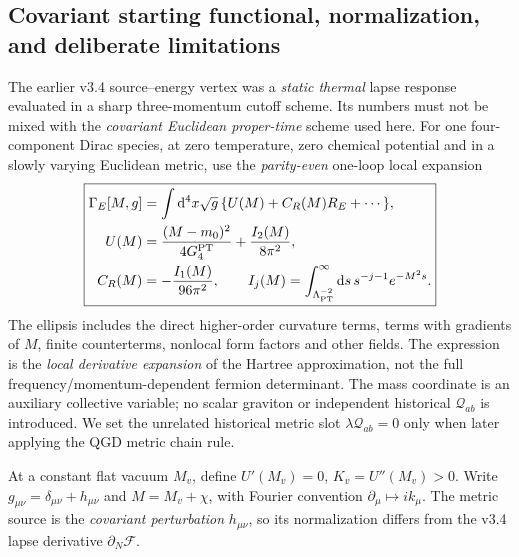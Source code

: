 \documentclass[11pt,a4paper]{article}
\theoremstyle{remark}\newtheorem{remark}[theorem]{Remark}
\newcommand{\dd}{\mathrm d}\newcommand{\Tr}{\operatorname{Tr}}\newcommand{\cO}{\mathcal O}\newcommand{\cG}{\mathcal G}\newcommand{\cH}{\mathcal H}\newcommand{\cE}{\mathcal E}\newcommand{\cK}{\mathcal K}\newcommand{\AX}{\textsf{[AXIOM]}}\newcommand{\D}{\textsf{[DERIVED]}}\newcommand{\C}{\textsf{[CONDITIONAL]}}\newcommand{\OPEN}{\textsf{[OPEN]}}
\begin{document}
\subsection{Covariant starting functional, normalization, and deliberate limitations}
The earlier v3.4 source--energy vertex was a \emph{static thermal} lapse response evaluated in a sharp three-momentum cutoff scheme. Its numbers must not be mixed with the \emph{covariant Euclidean proper-time} scheme used here. For one four-component Dirac species, at zero temperature, zero chemical potential and in a slowly varying Euclidean metric, use the \emph{parity-even} one-loop local expansion
\begin{equation}\label{eq:v35-action}
\boxed{\begin{aligned}
\Gamma_E[M,g]&=\int \dd^4x\sqrt g\,\{U(M)+C_R(M)R_E+\cdots\},\\
U(M)&=\frac{(M-m_0)^2}{4G_4^{\rm PT}}+\frac{I_2(M)}{8\pi^2},\\
C_R(M)&=-\frac{I_1(M)}{96\pi^2},\qquad
I_j(M)=\int_{\Lambda_{\rm PT}^{-2}}^\infty \dd s\,s^{-j-1}e^{-M^2s}.
\end{aligned}}
\end{equation}
The ellipsis includes the direct higher-order curvature terms, terms with gradients of $M$, finite counterterms, nonlocal form factors and other fields. The expression is the \emph{local derivative expansion} of the Hartree approximation, not the full frequency/momentum-dependent fermion determinant. The mass coordinate is an auxiliary collective variable; no scalar graviton or independent historical $\mathcal Q_{ab}$ is introduced. We set the unrelated historical metric slot $\lambda\mathcal Q_{ab}=0$ only when later applying the QGD metric chain rule.

At a constant flat vacuum $M_v$, define $U'(M_v)=0$, $K_v=U''(M_v)>0$. Write $g_{\mu\nu}=\delta_{\mu\nu}+h_{\mu\nu}$ and $M=M_v+\chi$, with Fourier convention $\partial_\mu\mapsto ik_\mu$. The metric source is the \emph{covariant perturbation} $h_{\mu\nu}$, so its normalization differs from the v3.4 lapse derivative $\partial_N\mathcal F$.
\end{document}
